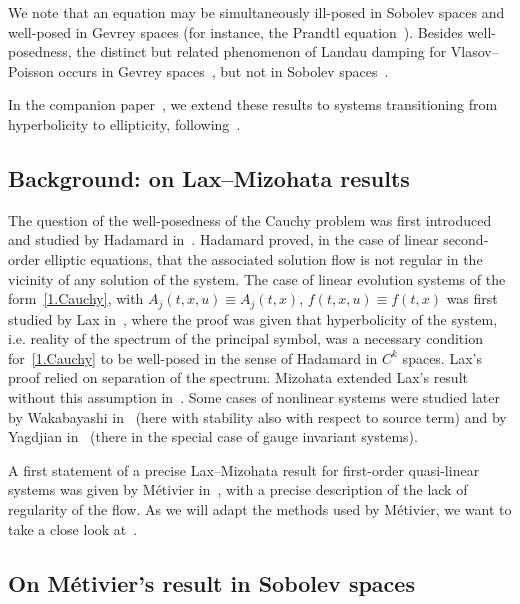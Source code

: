 \documentclass[AHL,Unicode,longabstracts,published]{cedram}
\theoremstyle{plain}
\begin{document}
We note that an equation may be simultaneously ill-posed in Sobolev spaces and well-posed in Gevrey spaces (for instance, the Prandtl equation~\cite{gerard2010ill,gerard2013well}). Besides well-posedness, the distinct but related phenomenon of Landau damping for Vlasov--Poisson occurs in Gevrey spaces~\cite{bedrossian2013landau,mouhot2010landau}, but not in Sobolev spaces~\cite{bedrossian2016nonlinear}.

In the companion paper~\cite{morisse2016II}, we extend these results to systems transitioning from hyperbolicity to ellipticity, following~\cite{lerner2010instability,lerner2015onset}.


\subsection{Background: on Lax--Mizohata results}


The question of the well-posedness of the Cauchy problem was first introduced and studied by Hadamard in~\cite{hadamard1902problemes}. Hadamard proved, in the case of linear second-order elliptic equations, that the associated solution flow is not regular in the vicinity of any solution of the system. The case of linear evolution systems of the form~\eqref{1.Cauchy}, with $A_j(t,x,u) \equiv A_j(t,x) $, $f(t,x,u) \equiv f(t,x)$ was first studied by Lax in~\cite{lax2005asymptotic}, where the proof was given that hyperbolicity of the system, i.e. reality of the spectrum of the principal symbol, was a necessary condition for~\eqref{1.Cauchy} to be well-posed in the sense of Hadamard in $C^k$ spaces. Lax's proof relied on separation of the spectrum. Mizohata extended Lax's result without this assumption in~\cite{mizohata1961some}. Some cases of nonlinear systems were studied later by Wakabayashi in~\cite{wakabayashi2001lax} (here with stability also with respect to source term) and by Yagdjian in~\cite{yagdjian2002lax,yagdjian1998note} (there in the special case of gauge invariant systems).

A first statement of a precise Lax--Mizohata result for first-order quasi-linear systems was given by Métivier in~\cite{metivier2005remarks}, with a precise description of the lack of regularity of the flow. As we will adapt the methods used by Métivier, we want to take a close look at~\cite{metivier2005remarks}.


\subsection{On Métivier's result in Sobolev spaces}\label{1.subsubsection.metivier}
\end{document}
